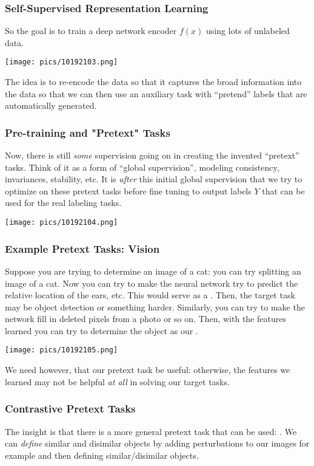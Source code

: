 \documentclass[11pt]{scrartcl}
\begin{document}
\subsubsection{Self-Supervised Representation Learning}
So the goal is to train a deep network encoder $f(x)$ using lots of unlabeled data. 
\begin{center}
    \texttt{[image: pics/10192103.png]}
\end{center}
The idea is to re-encode the data so that it captures the broad information into the data so that we can then use an auxiliary task with ``pretend'' labels that are automatically generated. 

\subsubsection{Pre-training and "Pretext" Tasks}
Now, there is still \textit{some} supervision going on in creating the invented ``pretext'' tasks. Think of it as a form of ``global supervision'', modeling consistency, invariances, stability, etc.  It is \textit{after} this initial global supervision that we try to optimize on these pretext tasks before fine tuning to output labels $Y$ that can be used for the real labeling tasks. 
\begin{center}
\texttt{[image: pics/10192104.png]}
\end{center}

\subsubsection{Example Pretext Tasks: Vision}
Suppose you are trying to determine an image of a cat: you can try splitting an image of a cat. Now you can try to make the neural network try to predict the relative location of the ears, etc. This would serve as a . Then, the target task may be object detection or something harder. Similarly, you can try to make the network fill in deleted pixels from a photo or so on. Then, with the features learned you can try to determine the object as our .
\begin{center}
    \texttt{[image: pics/10192105.png]}
\end{center}

We need however, that our pretext task be useful: otherwise, the features we learned may not be helpful \textit{at all} in solving our target tasks. 

\subsubsection{Contrastive Pretext Tasks}
The insight is that there is a more general pretext task that can be used: . We can \textit{define} similar and disimilar objects by adding perturbations to our images for example and then defining similar/disimilar objects. 
\end{document}
